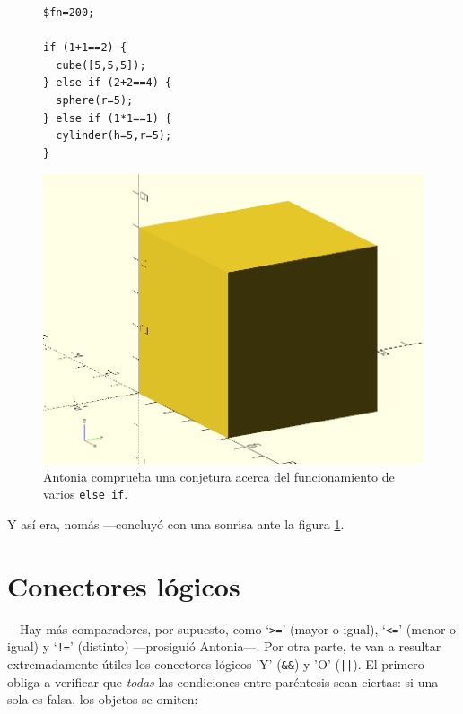   \begin{figure}[ht]
\begin{minipage}[]{.5\textwidth}%
\begin{lstlisting}
$fn=200;

if (1+1==2) {
  cube([5,5,5]);
} else if (2+2==4) {
  sphere(r=5);
} else if (1*1==1) {
  cylinder(h=5,r=5);
}
\end{lstlisting}%
\end{minipage}
\begin{minipage}[]{.49\textwidth}%

  \centering
  \includegraphics[width=.8\textwidth]{imagenes/if-4}
\end{minipage}
\caption{Antonia comprueba una conjetura acerca del funcionamiento de
  varios \lstinline!else if!.}
\label{fig:if-4}
\end{figure}


\guillemotright Y así era, nomás ---concluyó con una sonrisa ante la
figura \ref{fig:if-4}.

\section{Conectores lógicos}

---Hay más comparadores, por supuesto, como `\lstinline!>=!'  (mayor o
igual), `\lstinline{<=}' (menor o igual) y `\lstinline{!=}' (distinto)
---prosiguió Antonia---. Por otra parte, te van a resultar
extremadamente útiles los conectores lógicos 'Y' (\lstinline!&&!) y
'O' (\lstinline!||!). El primero obliga a verificar que \emph{todas}
las condiciones entre paréntesis sean ciertas: si una sola es falsa,
los objetos se omiten:

